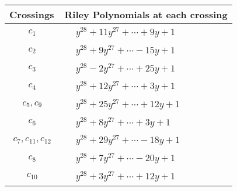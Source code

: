 \documentclass[1p]{elsarticle_modified}
\theoremstyle{definition}
\begin{document}
\begin{tabular}{m{50pt}|m{274pt}}
Crossings & \hspace{64pt}Riley Polynomials at each crossing \\
\hline $$\begin{aligned}c_{1}\end{aligned}$$&$\begin{aligned}
&y^{28}+11 y^{27}+\cdots+9 y+1
\end{aligned}$\\
\hline $$\begin{aligned}c_{2}\end{aligned}$$&$\begin{aligned}
&y^{28}+9 y^{27}+\cdots-15 y+1
\end{aligned}$\\
\hline $$\begin{aligned}c_{3}\end{aligned}$$&$\begin{aligned}
&y^{28}-2 y^{27}+\cdots+25 y+1
\end{aligned}$\\
\hline $$\begin{aligned}c_{4}\end{aligned}$$&$\begin{aligned}
&y^{28}+12 y^{27}+\cdots+3 y+1
\end{aligned}$\\
\hline $$\begin{aligned}c_{5},c_{9}\end{aligned}$$&$\begin{aligned}
&y^{28}+25 y^{27}+\cdots+12 y+1
\end{aligned}$\\
\hline $$\begin{aligned}c_{6}\end{aligned}$$&$\begin{aligned}
&y^{28}+8 y^{27}+\cdots+3 y+1
\end{aligned}$\\
\hline $$\begin{aligned}c_{7},c_{11},c_{12}\end{aligned}$$&$\begin{aligned}
&y^{28}+29 y^{27}+\cdots-18 y+1
\end{aligned}$\\
\hline $$\begin{aligned}c_{8}\end{aligned}$$&$\begin{aligned}
&y^{28}+7 y^{27}+\cdots-20 y+1
\end{aligned}$\\
\hline $$\begin{aligned}c_{10}\end{aligned}$$&$\begin{aligned}
&y^{28}+3 y^{27}+\cdots+12 y+1
\end{aligned}$\\
\hline
\end{tabular}\\~\\
\end{document}
